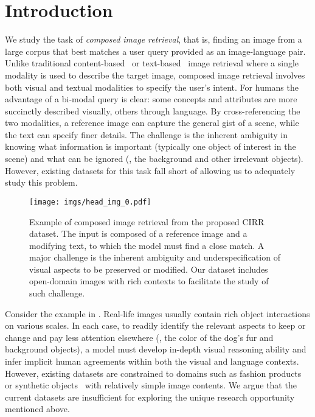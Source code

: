 \documentclass[10pt,twocolumn,letterpaper]{article}
\newcommand{\dstname}{CIRR\xspace}
\begin{document}
\section{Introduction} \label{sec:intro}
We study the task of \emph{composed image retrieval}, that is, finding an image from a large corpus that best matches a user query provided as an image-language pair. Unlike traditional content-based~\cite{10.1145/500141.500159_cbir} or text-based~\cite{zhang_tbir,6126478_tbir} image retrieval where a single modality is used to describe the target image, composed image retrieval involves both visual and textual modalities to specify the user's intent. For humans the advantage of a bi-modal query is clear: some concepts and attributes are more succinctly described visually, others through language. By cross-referencing the two modalities, a reference image can capture the general gist of a scene, while the text can specify finer details. 
The challenge is the inherent ambiguity in knowing what information is important (typically one object of interest in the scene) and what can be ignored (\eg, the background and other irrelevant objects). However, existing datasets for this task fall short of allowing us to adequately study this problem.

\begin{figure}[t]
  \begin{center}
    \texttt{[image: imgs/head\_img\_0.pdf]}
  \end{center}
   \caption{Example of composed image retrieval from the proposed \dstname dataset. The input is composed of a reference image and a modifying text, to which the model must find a close match. A major challenge is the inherent ambiguity and underspecification of visual aspects to be preserved or modified. Our dataset includes open-domain images with rich contexts to facilitate the study of such challenge.}
   \label{fig:intro-0}
\end{figure}

Consider the example in . 
Real-life images usually contain rich object interactions on various scales. In each case, to readily identify the relevant aspects to keep or change and pay less attention elsewhere (\eg, the color of the dog's fur and background objects), a model must develop in-depth visual reasoning ability and infer implicit human agreements within both the visual and language contexts.
However, existing datasets are constrained to domains such as fashion products~\cite{fashioniq,han2017automatic_fashion200k,10.5555/1886063.1886114_shoes} or synthetic objects~\cite{Vo_2019_tirg} with relatively simple image contents.
We argue that the current datasets are insufficient for exploring the unique research opportunity mentioned above.
\end{document}
